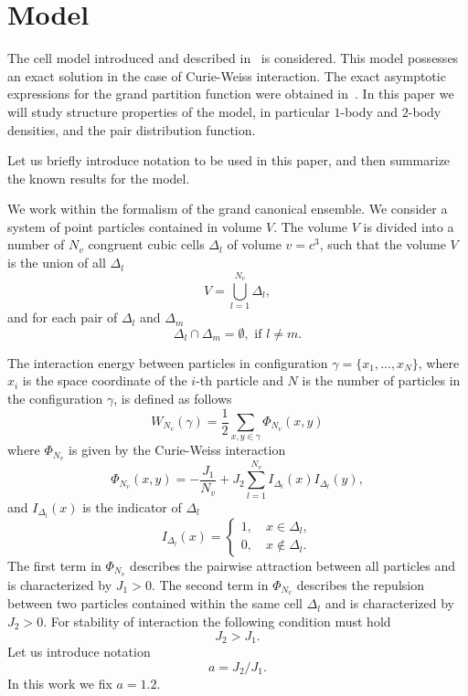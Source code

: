 \section{\label{sec:model} Model}
The cell model introduced and described in~\cite{KKD2018book,KKD2020} is considered. This model possesses an exact solution in the case of Curie-Weiss interaction. The exact asymptotic expressions for the grand partition function were obtained in~\cite{KKD2020}. In this paper we will study structure properties of the model, in particular $1$-body and $2$-body densities, and the pair distribution function.

Let us briefly introduce notation to be used in this paper, and then summarize the known results for the model.

We work within the formalism of the grand canonical ensemble. We consider a system of point particles contained in volume $V$. The volume $V$ is divided into a number of $N_v$ congruent cubic cells $\Delta_l$ of volume $v=c^3$, such that the volume $V$ is the union of all $\Delta_l$
\begin{equation*}
	V = \bigcup_{l=1}^{N_v}\Delta_l,
\end{equation*}
and for each pair of $\Delta_l$ and $\Delta_m$
\begin{equation*}
	\Delta_l \cap \Delta_m = \emptyset, \text{ if } l \neq m.
\end{equation*}

The interaction energy between particles in configuration $\gamma = \{x_1, ..., x_N\}$, where $x_i$ is the space coordinate of the $i$-th particle and $N$ is the number of particles in the configuration $\gamma$, is defined as follows
\begin{equation*}
	W_{N_v}(\gamma) = \frac{1}{2} \sum_{x,y \in \gamma} \Phi_{N_v} (x,y)
\end{equation*}
where $\Phi_{N_v}$ is given by the Curie-Weiss interaction
\begin{equation}
	\label{def:curie-weiss-pot}
	\Phi_{N_v}(x, y) = -\frac{J_1}{N_v} + J_2\sum_{l=1}^{N_v} I_{\Delta_l}(x) I_{\Delta_l}(y),
\end{equation}
and $I_{\Delta_l}(x)$ is the indicator of $\Delta_l$
\begin{equation*}
	I_{\Delta_l} (x) = \left\{
	\begin{array}{ll}
		1, \quad x \in \Delta_l,
		\\
		0, \quad x \notin \Delta_l.
	\end{array}
	\right.
\end{equation*}
The first term in $\Phi_{N_v}$ describes the pairwise attraction between all particles and is characterized by $J_1 > 0$. The second term in $\Phi_{N_v}$ describes the repulsion between two particles contained within the same cell $\Delta_l$ and is characterized by $J_2 > 0.$ For stability of interaction the following condition must hold
\begin{equation*}
	J_2 > J_1.
\end{equation*}
Let us introduce notation
$$a = J_2/J_1.$$
In this work we fix $a=1.2$.

